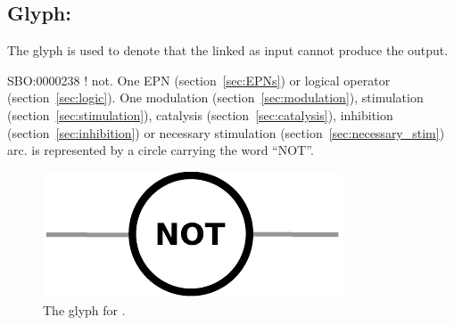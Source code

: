 \subsection{Glyph: }\label{sec:not}

The glyph  is used to denote that the  linked as input cannot produce the output.  

\begin{glyphDescription}
 \glyphSboTerm SBO:0000238 ! not.
 \glyphOrigin One EPN (section~\ref{sec:EPNs}) or logical operator (section~\ref{sec:logic}).
 \glyphTarget  One modulation (section~\ref{sec:modulation}), stimulation (section~\ref{sec:stimulation}), catalysis (section~\ref{sec:catalysis}), inhibition (section~\ref{sec:inhibition}) or necessary stimulation (section~\ref{sec:necessary_stim}) arc.
 \glyphNode {} is represented by a circle carrying the word ``NOT''.
 \end{glyphDescription}

\begin{figure}[H]
  \centering
  \includegraphics[scale = 0.5]{images/not}
  \caption{The \PD glyph for .}
  \label{fig:not}
\end{figure}


